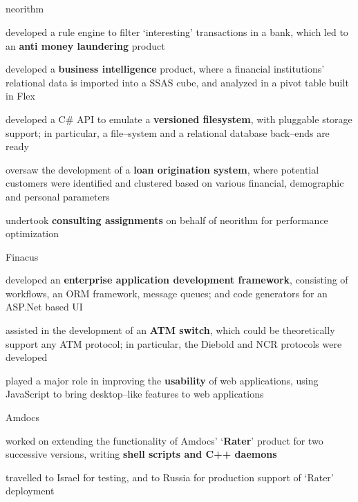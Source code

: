 \documentclass[a4paper,11pt,final]{article}
\newcommand{\resumetitle}[1]{%
  \subsection*{%
    \large\sc{#1}%
    \normalsize
  }%
  
}%
\newcommand{\resumedescheader}[1]{%
  \smallskip%
  \resumetitle{#1}
}%
\newenvironment{resumedescription}{%
  \begin{basedescript}{\desclabelstyle{\multilinelabel}\desclabelwidth{0.15\linewidth}}{%
      \renewcommand{\makelabel}[1]{{##1}}%
    }%
      \setlength{\itemsep}{0pt}
}{%
  \end{basedescript}%
}
\begin{document}
\resumedescheader{Professional Experience}
\begin{resumedescription}
\item[neorithm]
\begin{itemize*}
\item developed a rule engine to filter `interesting' transactions in a bank, which led to an \textbf{anti money laundering} product
\item developed a \textbf{business intelligence} product, where a financial institutions' relational data is imported into a SSAS cube, and analyzed in a pivot table built in Flex
\item developed a C\# API to emulate a \textbf{versioned filesystem}, with pluggable storage support; in particular, a file--system and a relational database back--ends are ready
\item oversaw the development of a \textbf{loan origination system}, where potential customers were identified and clustered based on various financial, demographic and personal parameters
\item undertook \textbf{consulting assignments} on behalf of neorithm for performance optimization
\end{itemize*}
\item[Finacus]
\begin{itemize*}
\item developed an \textbf{enterprise application development framework}, consisting of workflows, an ORM framework, message queues; and code generators for an ASP.Net based UI
\item assisted in the development of an \textbf{ATM switch}, which could be theoretically support any ATM protocol; in particular, the Diebold and NCR protocols were developed
\item played a major role in improving the \textbf{usability} of web applications, using JavaScript to bring desktop--like features to web applications
\end{itemize*}
\item[Amdocs]
\begin{itemize*}
\item worked on extending the functionality of Amdocs' `\textbf{Rater}' product for two successive versions, writing \textbf{shell scripts and C++ daemons}
\item travelled to Israel for testing, and to Russia for production support of `Rater' deployment
\end{itemize*}
\end{resumedescription}
\end{document}
